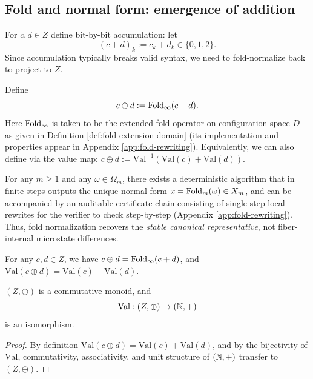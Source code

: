 \subsection{Fold and normal form: emergence of addition}
For $c,d\in Z$ define bit-by-bit accumulation: let
$$
(c+d)_k:=c_k+d_k\in\{0,1,2\}.
$$
Since accumulation typically breaks valid syntax, we need to fold-normalize back to project to $Z$.\par

\begin{definition}\label{def:stable-add}
Define
$$
c\oplus d := \mathrm{Fold}_\infty(c+d).
$$
Here $\mathrm{Fold}_\infty$ is taken to be the extended fold operator on configuration space $D$ as given in Definition \ref{def:fold-extension-domain} (its implementation and properties appear in Appendix \ref{app:fold-rewriting}). Equivalently, we can also define via the value map: $c\oplus d := \mathrm{Val}^{-1}(\mathrm{Val}(c)+\mathrm{Val}(d))$.\par
\end{definition}

\begin{proposition}\label{prop:fold-normalize-alg}
For any $m\ge 1$ and any $\omega\in\Omega_m$, there exists a deterministic algorithm that in finite steps outputs the unique normal form $x=\mathrm{Fold}_m(\omega)\in X_m$, and can be accompanied by an auditable certificate chain consisting of single-step local rewrites for the verifier to check step-by-step (Appendix \ref{app:fold-rewriting}). Thus, fold normalization recovers the \emph{stable canonical representative}, not fiber-internal microstate differences.\par
\end{proposition}

\begin{corollary}\label{cor:fold-add}
For any $c,d\in Z$, we have $c\oplus d=\mathrm{Fold}_\infty(c+d)$, and $\mathrm{Val}(c\oplus d)=\mathrm{Val}(c)+\mathrm{Val}(d)$.\par
\end{corollary}

\begin{theorem}\label{thm:add-isom}
$(Z,\oplus)$ is a commutative monoid, and
$$
\mathrm{Val}:(Z,\oplus)\to(\mathbb{N},+)
$$
is an isomorphism.\par
\end{theorem}

\begin{proof}
By definition $\mathrm{Val}(c\oplus d)=\mathrm{Val}(c)+\mathrm{Val}(d)$, and by the bijectivity of $\mathrm{Val}$, commutativity, associativity, and unit structure of $(\mathbb{N},+)$ transfer to $(Z,\oplus)$.\par
\end{proof}

